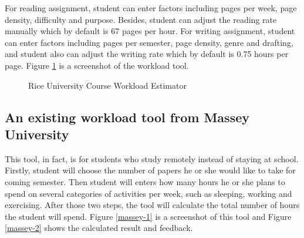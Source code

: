 \documentclass[fyp]{socreport}
\begin{document}
For reading assignment, student can enter factors including pages per week, page density, difficulty and purpose. Besides, student can adjust the reading rate manually which by default is 67 pages per hour. For writing assignment, student can enter factors including pages per semester, page density, genre and drafting, and student also can adjust the writing rate which by default is 0.75 hours per page. Figure {\ref{rice-1}} is a screenshot of the workload tool.

\begin{figure}
\caption{Rice University Course Workload Estimator}
\label{rice-1}
\end{figure}

\subsection{An existing workload tool from Massey University}
This tool, in fact, is for students who study remotely instead of staying at school. Firstly, student will choose the number of papers he or she would like to take for coming semester. Then student will enters how many hours he or she plans to spend on several categories of activities per week, such as sleeping, working and exercising. After those two steps, the tool will calculate the total number of hours the student will spend. Figure {\ref{massey-1}} is a screenshot of this tool and Figure {\ref{massey-2}} shows the calculated result and feedback.
\end{document}
